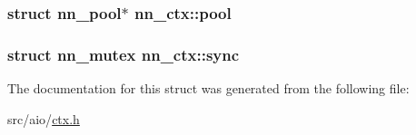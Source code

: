 \subsubsection[{pool}]{\setlength{\rightskip}{0pt plus 5cm}struct {\bf nn\+\_\+pool}$\ast$ nn\+\_\+ctx\+::pool}\hypertarget{structnn__ctx_a19a7c8ad423a87033ddf12550c1d3bec}{}\label{structnn__ctx_a19a7c8ad423a87033ddf12550c1d3bec}
\subsubsection[{sync}]{\setlength{\rightskip}{0pt plus 5cm}struct {\bf nn\+\_\+mutex} nn\+\_\+ctx\+::sync}\hypertarget{structnn__ctx_a264057ae180e58357895cbcbd594101b}{}\label{structnn__ctx_a264057ae180e58357895cbcbd594101b}


The documentation for this struct was generated from the following file\+:\begin{DoxyCompactItemize}
\item 
src/aio/\hyperlink{ctx_8h}{ctx.\+h}\end{DoxyCompactItemize}
